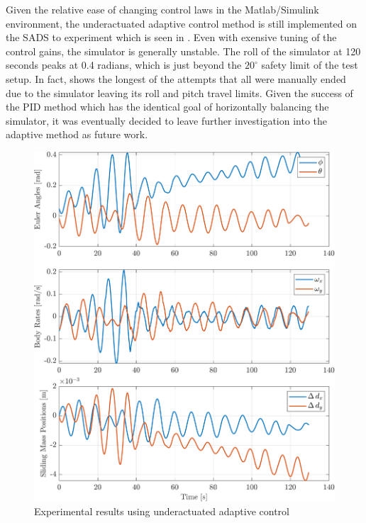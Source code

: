 Given the relative ease of changing control laws in the Matlab/Simulink environment, the underactuated adaptive control method is still implemented on the SADS to experiment which is seen in . Even with exensive tuning of the control gains, the simulator is generally unstable. The roll of the simulator at 120 seconds peaks at 0.4 radians, which is just beyond the $20^{\circ}$ safety limit of the test setup. In fact,  shows the longest of the attempts that all were manually ended due to the simulator leaving its roll and pitch travel limits. Given the success of the PID method which has the identical goal of horizontally balancing the simulator, it was eventually decided to leave further investigation into the adaptive method as future work.  



\begin{figure}[!ht]
    \centering
    \includegraphics[width=\linewidth]{plots/adaptive_hardware_failure.pdf}
    \caption{Experimental results using underactuated adaptive control}
    \label{fig:adaptive_hardware_failure}
\end{figure}


